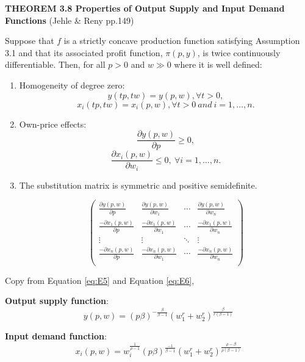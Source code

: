 \documentclass{article}
\begin{document}
\begin{mdframed}[backgroundcolor=blue!20,linecolor=white]

\textbf{THEOREM 3.8 Properties of Output Supply and Input Demand Functions} (Jehle \& Reny pp.149)

Suppose that $f$ is a strictly concave production function satisfying Assumption 3.1 and that its associated profit function, $\pi(p, y)$, is twice continuously differentiable. Then, for all $p > 0$ and $w \gg 0$ where it is well defined:

\begin{enumerate}

\item Homogeneity of degree zero:
$$y(tp,tw) = y (p,w), \forall t > 0,$$
$$x_i(tp,tw) = x_i(p,w), \forall t > 0 \ and \  i = 1,\dots, n.$$
\item Own-price effects:
$$\frac{\partial y(p,w)}{\partial p} \ge 0,$$
$$\frac{\partial x_i(p,w)}{\partial w_i} \le 0, \ \forall i = 1,\dots, n. $$

\item The substitution matrix is symmetric and positive semidefinite.

\begin{equation}
\left(
    \begin{array}{cccc}
    \frac{\partial y(p,w)}{\partial p} & \frac{\partial y(p,w)}{\partial w_1} & \cdots & \frac{\partial y(p,w)}{\partial w_n} \\
    \frac{-\partial x_1(p,w)}{\partial p} & \frac{-\partial x_1(p,w)}{\partial w_1} & \cdots & \frac{-\partial x_1(p,w)}{\partial w_n} \\
    \vdots    &    \vdots & \ddots &   \vdots \\
    \frac{-\partial x_n(p,w)}{\partial p} & \frac{-\partial x_n(p,w)}{\partial w_1} & \cdots & \frac{-\partial x_n(p,w)}{\partial w_n} \\
    \end{array}
    \right)
\label{eq:subst}   
\end{equation}
\end{enumerate}
\end{mdframed}


Copy from Equation \ref{eq:E5}  and Equation \ref{eq:E6},

\textbf{Output supply function}:
$$
y(p,w) = (p\beta)^{-\frac{\beta}{\beta - 1}}(w_1^r + w_2^r)^{\frac{\beta}{r(\beta - 1)}}
$$

\textbf{Input demand function}:
$$
x_i(p,w) = w_i^{\frac{1}{\rho -1}}  (p\beta)^{\frac{-1}{\beta - 1}}(w_1^r + w_2^r)^{\frac{\rho -\beta}{\rho(\beta -1)}}
$$
\end{document}
